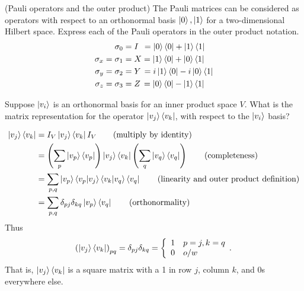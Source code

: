  (Pauli operators and the outer product) The Pauli matrices can be considered as operators with respect to an orthonormal basis $\ket{0}, \ket{1}$ for a two-dimensional Hilbert space.  Express each of the Pauli operators in the outer product notation.
\begin{align*}
	\sigma_0 &= I \hspace{4.5pt}= \ket{0}\bra{0} + \ket{1}\bra{1}\\
	\sigma_x = \sigma_1 &= X = \ket{1}\bra{0} + \ket{0}\bra{1}\\
	\sigma_y = \sigma_2 &= Y \hspace{1.5pt}=  i\ket{1}\bra{0} - i\ket{0}\bra{1}\\
	\sigma_z = \sigma_3 &= Z \hspace{1.5pt}= \ket{0}\bra{0} - \ket{1}\bra{1}
\end{align*}


 Suppose $\ket{v_i}$ is an orthonormal basis for an inner product space $V$.  What is the matrix representation for the operator $\ket{v_j}\bra{v_k}$, with respect to the $\ket{v_i}$ basis?
\Soln \begin{comment} Let $\ket{v}=\sum_i a_i\ket{v_i}$ be a vector in $V$. 
\begin{align*}
	(\ket{v_j}\bra{v_k})(\ket{v}) = (\ket{v_j}\bra{v_k})\left(\sum_i a_i\ket{v_i}\right) &= \sum_i\braket{v_k|v_i}\ket{v_j} \tag{definition}\\
	&= \sum_i\delta_{ki}\ket{v_j}
\end{align*}
\end{comment}
\begin{align*}
	\ket{v_j}\bra{v_k} &= I_V \ket{v_j} \bra{v_k} I_V \tag{multiply by identity}\\
	&= \left(\sum_p \ket{v_p}\bra{v_p} \right) \ket{v_j}\bra{v_k} \left(\sum_q \ket{v_q}\bra{v_q} \right) \tag{completeness}\\
	&= \sum_{p,q} \ket{v_p} \braket{v_p|v_j}\braket{v_k | v_q} \bra{v_q} \tag{linearity and outer product definition}\\
	&= \sum_{p,q} \delta_{pj} \delta_{kq} \ket{v_p} \bra{v_q} \tag{orthonormality}
\end{align*}
Thus
\begin{align*}
	\left( \ket{v_j}\bra{v_k} \right)_{pq} = \delta_{pj} \delta_{kq} = \left\{\begin{array}{ll}1 & p=j, k=q \\ 0 & o/w\end{array}.\right. 
\end{align*}
That is, $\ket{v_j}\bra{v_k}$ is a square matrix with a 1 in row $j$,  column $k$, and 0s everywhere else.

